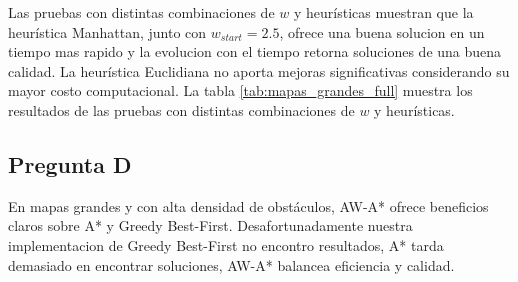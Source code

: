 \documentclass[12pt,a4paper]{article}
\begin{document}
\begin{table}[H]
    \centering
    \caption{Resultados en mapas grandes: tasa de éxito, longitudes promedio y métricas de tiempos.}
    \label{tab:mapas_grandes_full}
\end{table}

Las pruebas con distintas combinaciones de $w$ y heurísticas muestran que la heurística Manhattan, junto con $w_{start} = 2.5$, ofrece una buena solucion en un tiempo mas rapido y la evolucion con el tiempo retorna soluciones de una buena calidad. 
La heurística Euclidiana no aporta mejoras significativas considerando su mayor costo computacional. 
La tabla \ref{tab:mapas_grandes_full} muestra los resultados de las pruebas con distintas combinaciones de $w$ y heurísticas.

\subsection{Pregunta D}
En mapas grandes y con alta densidad de obstáculos, AW-A* ofrece beneficios claros sobre A* y Greedy Best-First. 
Desafortunadamente nuestra implementacion de Greedy Best-First no encontro resultados, A* tarda demasiado en encontrar soluciones, AW-A* balancea eficiencia y calidad. 
\end{document}
